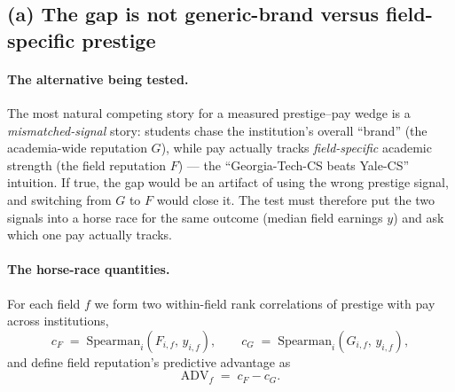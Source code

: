 \documentclass[11pt]{article}
\begin{document}
\subsection{(a) The gap is not generic-brand versus field-specific prestige}

\paragraph{The alternative being tested.} The most natural competing story for a measured prestige--pay wedge is a \emph{mismatched-signal} story: students chase the institution's overall ``brand'' (the academia-wide reputation $G$), while pay actually tracks \emph{field-specific} academic strength (the field reputation $F$) --- the ``Georgia-Tech-CS beats Yale-CS'' intuition. If true, the gap would be an artifact of using the wrong prestige signal, and switching from $G$ to $F$ would close it. The test must therefore put the two signals into a horse race for the same outcome (median field earnings $y$) and ask which one pay actually tracks.

\paragraph{The horse-race quantities.} For each field $f$ we form two within-field rank correlations of prestige with pay across institutions,
\[
c_F \;=\; \mathrm{Spearman}_i\!\left(F_{i,f},\, y_{i,f}\right), \qquad
c_G \;=\; \mathrm{Spearman}_i\!\left(G_{i,f},\, y_{i,f}\right),
\]
and define field reputation's predictive advantage as
\[
\mathrm{ADV}_f \;=\; c_F - c_G .
\]
\end{document}
